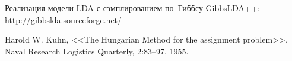 \documentclass[12pt]{article}
\begin{document}

\begin{thebibliography}{0}
  Реализация модели LDA с сэмплированием по~Гиббсу GibbsLDA++: \url{http://gibbslda.sourceforge.net/}

  Harold W. Kuhn, <<The Hungarian Method for the assignment problem>>, Naval Research Logistics Quarterly, 2:83–97, 1955.
\end{thebibliography}
\end{document}
